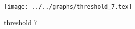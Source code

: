 \begin{figure}[h] \centering\texttt{[image: ../../graphs/threshold\_7.tex]}\caption{threshold 7}\label{gr:threshold_7} \end{figure}
